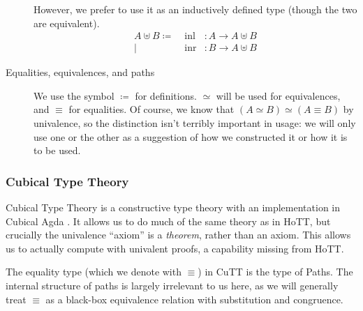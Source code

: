 \begin{description}
\begin{equation}
    \end{equation}
    However, we prefer to use it as an inductively defined type (though the two
    are equivalent).
    \begin{equation}
      \begin{aligned}
        A \uplus B \coloneqq & \;
        \text{inl} &: A \rightarrow A \uplus B \\
        | & \;  \text{inr} &: B \rightarrow A \uplus B
      \end{aligned}
    \end{equation}
  \item[Equalities, equivalences, and paths] We use the symbol \(\coloneqq\)
    for definitions.
    \(\simeq\) will be used for equivalences, and \(\equiv\) for equalities.
    Of course, we know that \((A \simeq B) \simeq (A \equiv B)\) by univalence,
    so the distinction isn't terribly important in usage: we will only use one
    or the other as a suggestion of how we constructed it or how it is to be
    used.
\end{description}
\subsubsection{Cubical Type Theory}
Cubical Type Theory \cite{cohenCubicalTypeTheory2016} is a constructive type
theory with an implementation in Cubical Agda
\cite{vezzosiCubicalAgdaDependently2019}.
It allows us to do much of the same theory as in HoTT, but crucially the
univalence ``axiom'' is a \emph{theorem}, rather than an axiom.
This allows us to actually compute with univalent proofs, a capability missing
from HoTT.
\begin{romdefinition} \label{path-types}
  The equality type (which we denote with \(\equiv\)) in CuTT is the type of
  Paths\footnotemark.
  The internal structure of paths is largely irrelevant to us here, as we will
  generally treat \(\equiv\) as a black-box equivalence relation with
  substitution and congruence.
\end{romdefinition}

